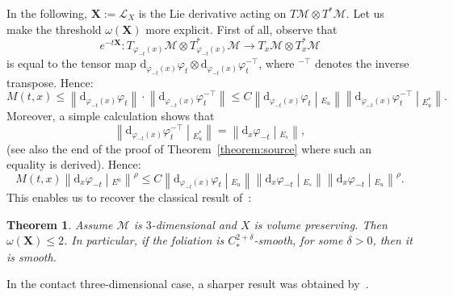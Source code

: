 \documentclass[10pt]{amsart}
\newtheorem{theo}{Theorem}[section]
\theoremstyle{definition}\newtheorem{defi}[theo]{Definition}\newtheorem{rema}[theo]{Remark}\newtheorem{exam}[theo]{Example}\newtheorem{exem}[theo]{Example}\newtheorem{nota}[theo]{Notation}
\newcommand{\X}{\mathbf{X}}
\newcommand{\mc}{\mathcal}
\newcommand{\M}{\mathcal{M}}
\newcommand{\dd}{\mathrm{d}}
\begin{document}
In the following, $\X := \mc{L}_X$ is the Lie derivative acting on $T\M \otimes T^*\M$. Let us make the threshold $\omega(\X)$ more explicit. First of all, observe that
\[
e^{-t \X} : T_{\varphi_{-t}(x)}\M \otimes T^*_{\varphi_{-t}(x)}\M \rightarrow T_{x}\M \otimes T^*_{x}\M
\]
is equal to the tensor map $\dd_{\varphi_{-t}(x)} \varphi_t \otimes \dd_{\varphi_{-t}(x)} \varphi_t^{-\top}$, where ${}^{-\top}$ denotes the inverse transpose. Hence:
\[
M(t,x) \leq \left\|\dd_{\varphi_{-t}(x)} \varphi_t\right\|\cdot\left\|\dd_{\varphi_{-t}(x)} \varphi_t^{-\top}\right\| \leq C \left\|\dd_{\varphi_{-t}(x)} \varphi_t\middle|_{E_u}\right\| \left\|\dd_{\varphi_{-t}(x)} \varphi_t^{-\top}\middle|_{E_u^*}\right\|.
\]
Moreover, a simple calculation shows that
\[
\left\|\dd_{\varphi_{-t}(x)} \varphi_t^{-\top}\middle|_{E_u^*}\right\| = \left\|\dd_x \varphi_{-t}\middle|_{E_s}\right\|,
\]
(see also the end of the proof of Theorem~\ref{theorem:source} where such an equality is derived). Hence:
\begin{equation}\label{equation:cal}
M(t,x) \left\|\dd_x \varphi_{-t}\middle|_{E^u}\right\|^\rho \leq C \left\|\dd_{\varphi_{-t}(x)} \varphi_t\middle|_{E_u}\right\| \left\|\dd_x \varphi_{-t}\middle|_{E_s}\right\| \left\|\dd_x \varphi_{-t}\middle|_{E_u}\right\|^\rho.
\end{equation}
This enables us to recover the classical result of~\cite{Hasselblatt-92}:

\begin{theo}\label{theo4.10}
Assume $\M$ is $3$-dimensional and $X$ is volume preserving. Then $\omega(\X)\leq 2$. In particular, if the foliation is $C^{2+\delta}_*$-smooth, for some $\delta > 0$, then it is smooth.
\end{theo}

In the contact three-dimensional case, a sharper result was obtained by~\cite{Hurder-Katok-90}.
\end{document}
